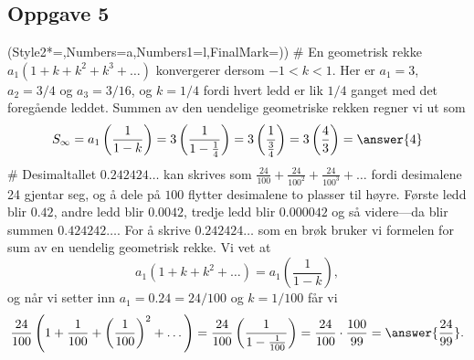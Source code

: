 \subsection*{Oppgave 5}
\begin{easylist}[enumerate]
	\ListProperties(Style2*=,Numbers=a,Numbers1=l,FinalMark={)})
	# En geometrisk rekke $a_1(1 + k + k^2 + k^3 + \dots)$ konvergerer dersom $-1 < k < 1$.
	Her er $a_1 = 3$, $a_2 = 3/4$ og $a_3 = 3/16$, og $k = 1/4$ fordi hvert ledd er lik $1/4$ ganget med det foregående leddet.
	Summen av den uendelige geometriske rekken regner vi ut som
	\begin{equation*}
		S_{\infty} = a_1 \left(\frac{1}{1 - k}\right) 
		= 3 \left(\frac{1}{1 - \frac{1}{4}}\right) 
		= 3 \left(\frac{1}{\frac{3}{4}}\right)
		=  3 \left(\frac{4}{3}\right)
		=  \answer{4}
	\end{equation*}
	# Desimaltallet $0.242424\dots$ kan skrives som 
	$\frac{24}{100} + \frac{24}{100^2} + \frac{24}{100^3} + \dots$
	fordi desimalene 24 gjentar seg, og å dele på $100$ flytter desimalene to plasser til høyre. 
	Første ledd blir $0.42$, andre ledd blir $0.0042$, tredje ledd blir $0.000042$ og så videre---da blir summen $0.424242\dots$.
	For å skrive $0.242424\dots$ som en brøk bruker vi formelen for sum av en uendelig geometrisk rekke. 
	Vi vet at
	\begin{equation*}
		a_1 (1 + k + k^2 + \dots) = a_1 \left(\frac{1}{1 - k}\right),
	\end{equation*}
	og når vi setter inn $a_1 = 0.24 = 24 / 100$ og $k = 1/100$ får vi
	\begin{equation*}
		\frac{24}{100} \left( 1 + \frac{1}{100} + \left(\frac{1}{100}\right)^2 + \dots \right) = \frac{24}{100} \left(\frac{1}{1 - \frac{1}{100}}\right) = \frac{24}{100} \cdot \frac{100}{99} = \answer{\frac{24}{99}}.
	\end{equation*}
\end{easylist}

